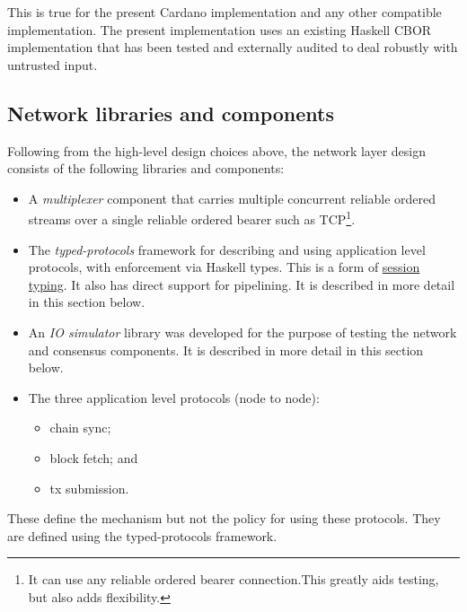 \documentclass[11pt,a4paper]{article}
\begin{document}
This is true for the present Cardano implementation and any other
compatible implementation. The present implementation uses an existing
Haskell CBOR implementation that has been tested and externally audited
to deal robustly with untrusted input.

\subsection{Network libraries and components}
\label{network-libraries-and-components}

Following from the high-level design choices above, the network layer
design consists of the following libraries and components:

\begin{itemize}
\item
  A \emph{multiplexer} component that carries multiple concurrent
  reliable ordered streams over a single reliable ordered bearer such as
  TCP\footnote{It can use any reliable ordered bearer connection.This
    greatly aids testing, but also adds flexibility.}.
\item
  The \emph{typed-protocols} framework for describing and using
  application level protocols, with enforcement via Haskell types. This
  is a form of \href{https://groups.inf.ed.ac.uk/abcd/}{{session
  typing}}. It also has direct support for pipelining. It is described
  in more detail in this section below.
\item
  An \emph{IO simulator} library was developed for the purpose of
  testing the network and consensus components. It is described in more
  detail in this section below.
\item
  The three application level protocols (node to node):

  \begin{itemize}
  \item
    chain sync;
  \item
    block fetch; and
  \item
    tx submission.
  \end{itemize}
\end{itemize}

These define the mechanism but not the policy for using these protocols.
They are defined using the typed-protocols framework.
\end{document}
